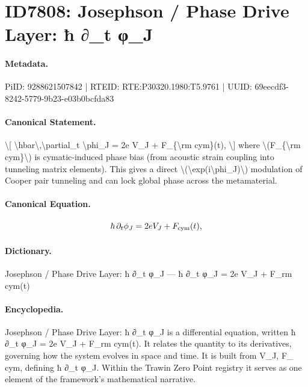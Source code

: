 \section*{ID7808: Josephson / Phase Drive Layer: ħ ∂\_t φ\_J}
\paragraph{Metadata.}
PiID: 9288621507842 | RTEID: RTE:P30320.1980:T5.9761 | UUID: 69eecdf3-8242-5779-9b23-e03b0bcfda83

\paragraph{Canonical Statement.}
\textbackslash{}[ \textbackslash{}hbar\textbackslash{},\textbackslash{}partial\_t \textbackslash{}phi\_J = 2e V\_J + F\_\{\textbackslash{}rm cym\}(t), \textbackslash{}] where \textbackslash{}(F\_\{\textbackslash{}rm cym\}\textbackslash{}) is cymatic-induced phase bias (from acoustic strain coupling into tunneling matrix elements). This gives a direct \textbackslash{}(\textbackslash{}exp(i\textbackslash{}phi\_J)\textbackslash{}) modulation of Cooper pair tunneling and can lock global phase across the metamaterial.

\paragraph{Canonical Equation.}
\[
\hbar\,\partial_t \phi_J = 2e V_J + F_{\rm cym}(t),
\]

\paragraph{Dictionary.}
Josephson / Phase Drive Layer: ħ ∂\_t φ\_J — ħ ∂\_t φ\_J = 2e V\_J + F\_rm cym(t)

\paragraph{Encyclopedia.}
Josephson / Phase Drive Layer: ħ ∂\_t φ\_J is a differential equation, written ħ ∂\_t φ\_J = 2e V\_J + F\_rm cym(t). It relates the quantity to its derivatives, governing how the system evolves in space and time. It is built from V\_J, F\_ cym, defining ħ ∂\_t φ\_J. Within the Trawin Zero Point registry it serves as one element of the framework's mathematical narrative.
